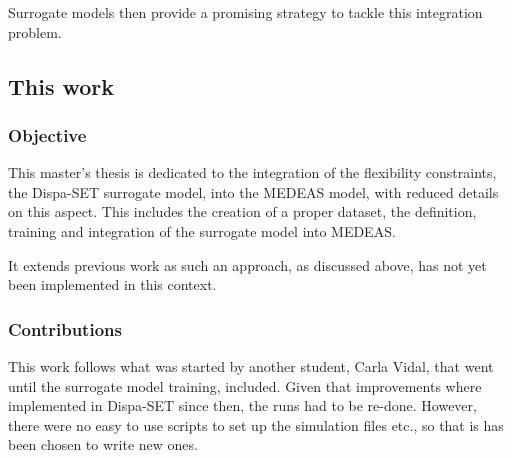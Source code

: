 Surrogate models then provide a promising strategy to tackle this integration problem.

\subsection{This work}

\subsubsection{Objective}

This master's thesis is dedicated to the integration of the flexibility constraints, the Dispa-SET surrogate model, into the MEDEAS model, with reduced details on this aspect. This includes the creation of a proper dataset, the definition, training and integration of the surrogate model into MEDEAS.
 
It extends previous work as such an approach, as discussed above, has not yet been implemented in this context.






\subsubsection{Contributions}

This work follows what was started by another student, Carla Vidal, that went until the surrogate model training, included. Given that improvements where implemented in Dispa-SET since then, the runs had to be re-done. However, there were no easy to use scripts to set up the simulation files etc., so that is has been chosen to write new ones.

